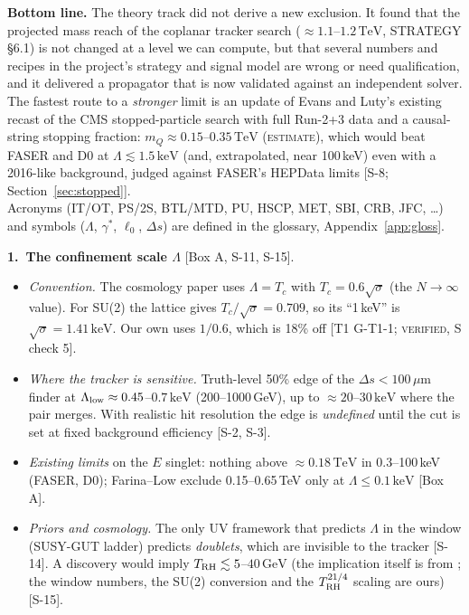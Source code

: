 \documentclass[11pt,a4paper]{article}
\newcommand{\EST}{\textsc{estimate}}
\newcommand{\VER}{\textsc{verified}}
\DeclareRobustCommand{\file}[1]{\path{#1}}
\newcommand{\mQ}{m_Q}
\newcommand{\GeV}{\ensuremath{\,\mathrm{GeV}}}
\newcommand{\TeV}{\ensuremath{\,\mathrm{TeV}}}
\newcommand{\keV}{\ensuremath{\,\mathrm{keV}}}
\newcommand{\um}{\ensuremath{\,\mu\mathrm{m}}}
\newcommand{\gst}{\gamma^*}
\newcommand{\Ds}{\Delta s}
\newcommand{\sqs}{\sqrt{\sigma}}
\newcommand{\src}[1]{{\color{mid}[#1]}}
\begin{document}
{\small
\begin{key}
\textbf{Bottom line.} The theory track did not derive a new exclusion. It found that the projected mass reach of the coplanar tracker search ($\approx1.1$--$1.2\TeV$, STRATEGY \S6.1) is not changed at a level we can compute, but that several numbers and recipes in the project's strategy and signal model are wrong or need qualification, and it delivered a propagator that is now validated against an independent solver. The fastest route to a \emph{stronger} limit is an update of Evans and Luty's existing recast \cite{EvansLuty} of the CMS stopped-particle search with full Run-2+3 data and a causal-string stopping fraction: $\mQ\approx0.15$--$0.35\TeV$ (\EST{}), which would beat FASER and D0 at $\Lambda\lesssim1.5\keV$ (and, extrapolated, near 100\,keV) even with a 2016-like background, judged against FASER's HEPData limits \src{S-8; Section~\ref{sec:stopped}}.\\[2pt]
{\footnotesize Acronyms (IT/OT, PS/2S, BTL/MTD, PU, HSCP, MET, SBI, CRB, JFC, \ldots) and symbols ($\Lambda$, $\gst$, $\ell_0$, $\Ds$) are defined in the glossary, Appendix~\ref{app:gloss}.}
\end{key}

\textbf{1.\ The confinement scale $\Lambda$} \src{Box A, S-11, S-15}.
\begin{itemize}[leftmargin=1.2em,itemsep=0pt,topsep=1pt]
\item \emph{Convention.} The cosmology paper \cite{cool} uses $\Lambda=T_c$ with $T_c=0.6\sqs$ (the $N\to\infty$ value). For SU(2) the lattice gives $T_c/\sqs=0.709$, so its ``1\,keV'' is $\sqs=1.41\keV$. Our own \file{theory_signal_model.md} uses $1/0.6$, which is 18\% off \src{T1 G-T1-1; \VER{}, S check 5}.
\item \emph{Where the tracker is sensitive.} Truth-level 50\% edge of the $\Ds<100\um$ finder at $\Lambda_{\rm low}\approx0.45$--$0.7\keV$ (200--1000\,GeV), up to $\approx20$--$30\keV$ where the pair merges. With realistic hit resolution the edge is \emph{undefined} until the cut is set at fixed background efficiency \src{S-2, S-3}.
\item \emph{Existing limits} on the $E$ singlet: nothing above $\approx0.18\TeV$ in 0.3--100\,keV (FASER, D0); Farina--Low exclude 0.15--0.65\,TeV only at $\Lambda\le0.1\keV$ \src{Box A}.
\item \emph{Priors and cosmology.} The only UV framework that predicts $\Lambda$ in the window (SUSY-GUT ladder) predicts \emph{doublets}, which are invisible to the tracker \src{S-14}. A discovery would imply $T_{\rm RH}\lesssim5$--$40\GeV$ (the implication itself is from \cite{cool}; the window numbers, the SU(2) conversion and the $T_{\rm RH}^{21/4}$ scaling are ours) \src{S-15}.
\end{itemize}

}
\end{document}
